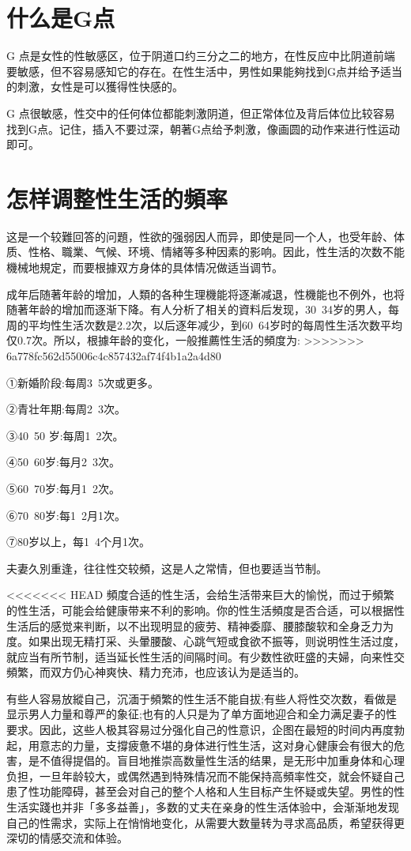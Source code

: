 \documentclass[12pt,UTF8]{ctexbook}
\begin{document}
\section{什么是G点}

G 点是女性的性敏感区，位于阴道口约三分之二的地方，在性反应中比阴道前端要敏感，但不容易感知它的存在。在性生活中，男性如果能夠找到G点并给予适当的刺激，女性是可以獲得性快感的。

G 点很敏感，性交中的任何体位都能刺激阴道，但正常体位及背后体位比较容易找到G点。记住，插入不要过深，朝著G点给予刺激，像画圆的动作来进行性运动即可。

\section{怎样调整性生活的頻率}

这是一个较難回答的问題，性欲的强弱因人而异，即使是同一个人，也受年龄、体质、性格、職業、气候、环境、情緒等多种因素的影响。因此，性生活的次数不能機械地規定，而要根據双方身体的具体情况做适当调节。

成年后随著年龄的增加，人類的各种生理機能将逐漸减退，性機能也不例外，也将随著年龄的增加而逐渐下降。有人分析了相关的資料后发现，30~34岁的男人，每周的平均性生活次数是2.2次，以后逐年减少，到60~64岁时的每周性生活次数平均仅0.7次。所以，根據年龄的变化，一般推薦性生活的頻度为:
>>>>>>> 6a778fc562d55006c4c857432af74f4b1a2a4d80

①新婚阶段:每周3~5次或更多。

②青壮年期:每周2~3次。

③40~50 岁:每周1~2次。

④50~60岁:每月2~3次。

⑤60~70岁:每月1~2次。

⑥70~80岁:每1~2月1次。

⑦80岁以上，每1~4个月1次。

夫妻久別重逢，往往性交较頻，这是人之常情，但也要适当节制。

<<<<<<< HEAD
頻度合适的性生活，会给生活带来巨大的愉悦，而过于頻繁的性生活，可能会给健康带来不利的影响。你的性生活頻度是否合适，可以根据性生活后的感觉来判断，以不出现明显的疲劳、精神委靡、腰膝酸软和全身乏力为度。如果出现无精打采、头暈腰酸、心跳气短或食欲不振等，则说明性生活过度，就应当有所节制，适当延长性生活的间隔时间。有少数性欲旺盛的夫婦，向来性交頻繁，而双方仍心神爽快、精力充沛，也应该认为是适当的。

有些人容易放縱自己，沉湎于頻繁的性生活不能自拔;有些人将性交次数，看做是显示男人力量和尊严的象征;也有的人只是为了单方面地迎合和全力满足妻子的性要求。因此，这些人极其容易过分强化自己的性意识，企图在最短的时间内再度勃起，用意志的力量，支撐疲惫不堪的身体进行性生活，这对身心健康会有很大的危害，是不值得提倡的。盲目地推崇高数量性生活的结果，是无形中加重身体和心理负担，一旦年龄较大，或偶然遇到特殊情况而不能保持高頻率性交，就会怀疑自己患了性功能障碍，甚至会对自己的整个人格和人生目标产生怀疑或失望。男性的性生活实踐也并非「多多益善」，多数的丈夫在亲身的性生活体验中，会渐渐地发现自己的性需求，实际上在悄悄地变化，从需要大数量转为寻求高品质，希望获得更深切的情感交流和体验。
\end{document}
